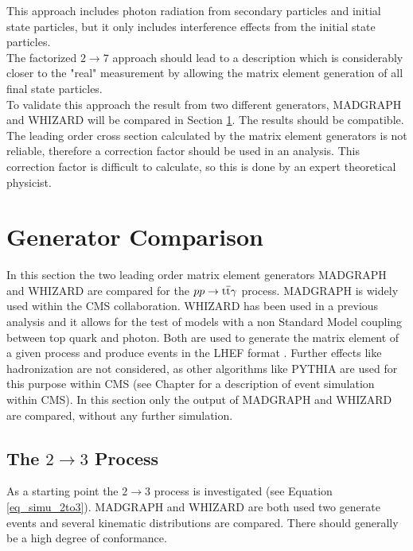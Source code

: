 This approach includes photon radiation from secondary particles and initial state particles, but it only includes interference effects from the initial state particles. \\
The factorized $2 \to 7$ approach should lead to a description which is considerably closer to the "real"  measurement by allowing the matrix element generation of all final state particles.\\
To validate this approach the result from two different generators, MADGRAPH and WHIZARD will be compared in Section \ref{ch_simu_comp}. The results should be compatible. \\
The leading order cross section calculated by the matrix element generators is not reliable, therefore a correction factor should be used in an analysis. This correction factor is difficult to calculate, so this is done by an expert theoretical physicist. \\ 

\section{Generator Comparison}
\label{ch_simu_comp}

In this section the two leading order matrix element generators MADGRAPH and WHIZARD are compared  for the $pp \to \mathrm{t}\overline{\mathrm{t}} \gamma$ process. MADGRAPH is widely used within the CMS collaboration. WHIZARD has been used in a previous \ttgamma analysis  and it allows for the test of models with a non Standard Model coupling between top quark and photon. Both are used to generate the matrix element of a given process and produce events in the LHEF format . Further effects like hadronization are not considered, as other algorithms like PYTHIA  are used for this purpose within CMS (see Chapter  for a description of event simulation within CMS). In this section only the output of MADGRAPH and WHIZARD are compared, without any further simulation. 

\subsection{The $2 \to 3$ Process}

As a starting point the $2 \to 3$ process is investigated (see Equation \ref{eq_simu_2to3}). MADGRAPH and WHIZARD are both used two generate events and several kinematic distributions are compared. There should generally be a high degree of conformance.

